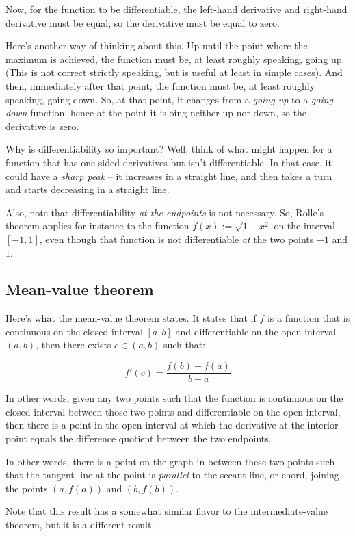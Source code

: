 \documentclass{amsart}
\begin{document}
Now, for the function to be differentiable, the left-hand derivative
and right-hand derivative must be equal, so the derivative must be
equal to zero.

Here's another way of thinking about this. Up until the point where
the maximum is achieved, the function must be, at least roughly
speaking, going up. (This is not correct strictly speaking, but is
useful at least in simple cases). And then, immediately after that
point, the function must be, at least roughly speaking, going
down. So, at that point, it changes from a {\em going up} to a {\em
going down} function, hence at the point it is oing neither up nor
down, so the derivative is zero.

Why is differentiability so important? Well, think of what might
happen for a function that has one-sided derivatives but isn't
differentiable. In that case, it could have a {\em sharp peak} -- it
increases in a straight line, and then takes a turn and starts
decreasing in a straight line.

Also, note that differentiability {\em at the endpoints} is not
necessary. So, Rolle's theorem applies for instance to the function
$f(x) := \sqrt{1 - x^2}$ on the interval $[-1,1]$, even though that
function is not differentiable {\em at} the two points $-1$ and $1$.

\subsection{Mean-value theorem}

Here's what the mean-value theorem states. It states that if $f$ is a
function that is continuous on the closed interval $[a,b]$ and
differentiable on the open interval $(a,b)$, then there exists $c \in
(a,b)$ such that:

$$f'(c) = \frac{f(b) - f(a)}{b - a}$$

In other words, given any two points such that the function is
continuous on the closed interval between those two points and
differentiable on the open interval, then there is a point in the open
interval at which the derivative at the interior point equals the
difference quotient between the two endpoints.

In other words, there is a point on the graph in between these two
points such that the tangent line at the point is {\em parallel} to
the secant line, or chord, joining the points $(a,f(a))$ and
$(b,f(b))$.

Note that this result has a somewhat similar flavor to the
intermediate-value theorem, but it is a different result.
\end{document}

